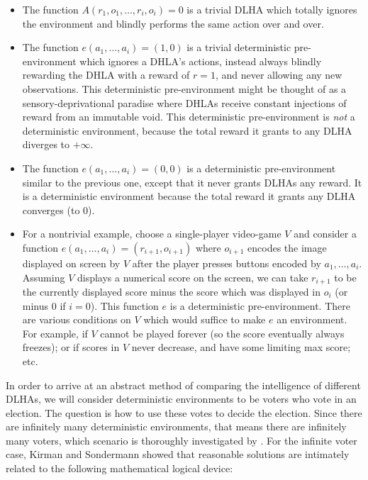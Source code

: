 \documentclass[twoside,11pt]{article}
\begin{document}
\begin{example}
    \begin{itemize}
        \item The function $A(r_1,o_1,\ldots,r_i,o_i)=0$ is a trivial DLHA which
        totally ignores the environment and blindly performs the same action
        over and over.
        \item The function $e(a_1,\ldots,a_i)=(1,0)$ is a trivial deterministic pre-environment
        which ignores a DHLA's actions, instead always blindly rewarding the DHLA
        with a reward of $r=1$, and never allowing any new observations. This
        deterministic pre-environment might be thought of as a sensory-deprivational paradise
        where DHLAs receive constant injections of reward from an immutable void.
        This deterministic pre-environment
        is \emph{not} a deterministic environment, because the total reward
        it grants to any DLHA diverges to $+\infty$.
        \item The function $e(a_1,\ldots,a_i)=(0,0)$ is a deterministic
        pre-environment similar to
        the previous one, except that it never grants DLHAs any reward. It is a
        deterministic environment because the total reward it grants
        any DLHA converges (to $0$).
        \item For a nontrivial example, choose a single-player video-game $V$ and 
        consider a function $e(a_1,\ldots,a_i)=(r_{i+1},o_{i+1})$
        where $o_{i+1}$ encodes the image displayed on screen
        by $V$ after the player presses buttons encoded by $a_1,\ldots,a_i$.
        Assuming $V$ displays a numerical score on the screen,
        we can take $r_{i+1}$ to be the currently displayed score minus the score which was
        displayed in $o_i$ (or minus $0$
        if $i=0$). This function $e$ is a deterministic pre-environment. There are various
        conditions on $V$ which would suffice to make $e$ an environment. For example,
        if $V$ cannot be played forever (so the score eventually always freezes);
        or if scores in $V$ never decrease, and have some limiting max score;
        etc.
    \end{itemize}
\end{example}

In order to arrive at an abstract method of comparing the intelligence of different
DLHAs, we will consider deterministic environments to be voters who vote in an election.
The question is how to use these votes to decide the election.
Since there are infinitely many deterministic environments, that means there are
infinitely many voters,
which scenario is thoroughly investigated by \citet{kirman}.
For the infinite voter case, Kirman and Sondermann showed that
reasonable solutions are intimately
related to the following mathematical logical device:
\end{document}
